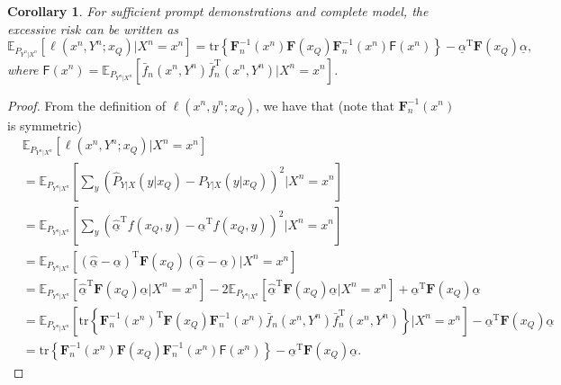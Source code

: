 \documentclass{article} %
\theoremstyle{plain} %
\newtheorem{corollary}[theorem]{Corollary}
\begin{document}
\begin{corollary}\label{col:excessive_risk_complete}
For sufficient prompt demonstrations and complete model, the excessive risk can be written as
\begin{equation*}
    \mathbb{E}_{P_{Y^n|X^n}}\left[ 
\ell \left(x^n,Y^n;x_Q\right) | X^n = x^n\right] = \mathrm{tr}\left\{ \mathbf{F}_n^{-1}(x^n)\mathbf{F}(x_Q)\mathbf{F}_n^{-1}(x^n) \mathsf{F}(x^n) \right\}  - \underline{\alpha}^{\mathrm{T}} \mathbf{F}(x_Q)\underline{\alpha}, 
\end{equation*}
where $\mathsf{F}(x^n) = \mathbb{E}_{P_{Y^n|X^n}}\left[\bar{f}_n(x^n,Y^n) \bar{f}_n^\mathrm{T}(x^n,Y^n) | X^n=x^n\right]$.
\end{corollary}
\begin{proof}
    From the definition of $\ell \left(x^n,y^n;x_Q\right)$, we have that (note that $\mathbf{F}_n^{-1}(x^n)$ is symmetric)
\begin{align*}
&\mathbb{E}_{P_{Y^n|X^n}}\left[ 
\ell \left(x^n,Y^n;x_Q\right) | X^n = x^n\right]\\
& = \mathbb{E}_{P_{Y^n|X^n}}\left[ 
\sum_{y} \left(\hat{P}_{Y|X}(y|x_Q) -  P_{Y|X}(y|x_Q) \right)^2 | X^n = x^n\right]\\
& = \mathbb{E}_{P_{Y^n|X^n}}\left[ \sum_y \left( \underline{\hat{\alpha}}^\mathrm{T} f(x_Q,y) - \underline{\alpha}^\mathrm{T}f(x_Q,y) \right)^2 | X^n=x^n\right]\\
& = \mathbb{E}_{P_{Y^n|X^n}}\left[ \left(\underline{\hat{\alpha}} - \underline{\alpha}\right)^\mathrm{T} \mathbf{F}(x_Q) \left(\underline{\hat{\alpha}} - \underline{\alpha}\right) | X^n=x^n \right]\\
& = \mathbb{E}_{P_{Y^n|X^n}}\left[\underline{\hat{\alpha}}^{\mathrm{T}} \mathbf{F}(x_Q)\underline{\hat{\alpha}}| X^n=x^n\right] -2 \mathbb{E}_{P_{Y^n|X^n}}\left[\underline{\hat{\alpha}}^{\mathrm{T}} \mathbf{F}(x_Q)\underline{\alpha}| X^n=x^n\right] + \underline{\alpha}^{\mathrm{T}} \mathbf{F}(x_Q)\underline{\alpha} \\
& = \mathbb{E}_{P_{Y^n|X^n}}\left[\mathrm{tr}\left\{ \mathbf{F}_n^{-1}(x^n)^\mathrm{T}\mathbf{F}(x_Q)\mathbf{F}_n^{-1}(x^n) \bar{f}_n(x^n,Y^n) \bar{f}_n^\mathrm{T}(x^n,Y^n) \right\} | X^n=x^n\right] - \underline{\alpha}^{\mathrm{T}} \mathbf{F}(x_Q)\underline{\alpha}\\
& = \mathrm{tr}\left\{ \mathbf{F}_n^{-1}(x^n)\mathbf{F}(x_Q)\mathbf{F}_n^{-1}(x^n) \mathsf{F}(x^n) \right\}  - \underline{\alpha}^{\mathrm{T}} \mathbf{F}(x_Q)\underline{\alpha}.
\end{align*}
\end{proof}
\end{document}
